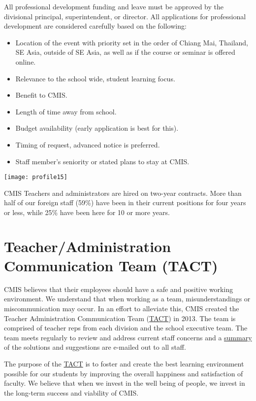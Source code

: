 All professional development funding and leave must be approved by the divisional principal, superintendent, or director.  All applications for professional development are considered carefully based on the following:

\begin{itemize}
\item Location of the event with priority set in the order of Chiang Mai, Thailand, SE Asia, outside of SE Asia, as well as if the course or seminar is offered online.
\item Relevance to the school wide, student learning focus.
\item Benefit to CMIS.
\item Length of time away from school.
\item Budget availability (early application is best for this).
\item Timing of request, advanced notice is preferred.
\item Staff member’s seniority or stated plans to stay at CMIS.
\end{itemize}

\texttt{[image: profile15]}

CMIS Teachers and administrators are hired on two-year contracts.  More than half of our foreign staff (59\%) have been in their current positions for four years or less, while 25\% have been here for 10 or more years. 

\section{Teacher/Administration Communication Team (TACT)}

CMIS believes that their employees should have a safe and positive working environment. We understand that when working as a team, misunderstandings or miscommunication may occur.  In an effort to alleviate this, CMIS created the Teacher Administration Communication Team (\href{https://docs.google.com/a/cmis.ac.th/document/d/14nhwcw8xo3i-23Q-WUxo6KJ_c8yFKu-jTdCctt4MFcs/edit?usp=sharing}{TACT}) in 2013. The team is comprised of teacher reps from each division and the school executive team. The team meets regularly to review and address current staff concerns and a \href{https://docs.google.com/a/cmis.ac.th/document/d/1KLB4c5_LkxXzq4vP2EuNhBVPp2q_FT9qy1cBBwaS5JM/edit?usp=sharing}{summary} of the solutions and suggestions are e-mailed out to all staff.

The purpose of the \href{https://docs.google.com/document/d/12ZwL4geAPTDcm-SI6U1fRpXEKxKZ-61q54upcikt6lc/edit}{TACT} is to foster and create the best learning environment possible for our students by improving the overall happiness and satisfaction of faculty. We believe that when we invest in the well being of people, we invest in the long-term success and viability of CMIS.

